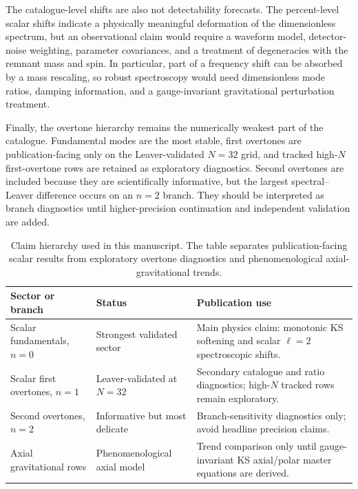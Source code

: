 \documentclass[10pt,letterpaper,twocolumn]{article}
\begin{document}
The catalogue-level shifts are also not detectability forecasts. The percent-level scalar shifts indicate a physically meaningful deformation of the dimensionless spectrum, but an observational claim would require a waveform model, detector-noise weighting, parameter covariances, and a treatment of degeneracies with the remnant mass and spin. In particular, part of a frequency shift can be absorbed by a mass rescaling, so robust spectroscopy would need dimensionless mode ratios, damping information, and a gauge-invariant gravitational perturbation treatment.

Finally, the overtone hierarchy remains the numerically weakest part of the catalogue. Fundamental modes are the most stable, first overtones are publication-facing only on the Leaver-validated \(N=32\) grid, and tracked high-\(N\) first-overtone rows are retained as exploratory diagnostics. Second overtones are included because they are scientifically informative, but the largest spectral--Leaver difference occurs on an \(n=2\) branch. They should be interpreted as branch diagnostics until higher-precision continuation and independent validation are added.

\begin{table}[t]
\centering
\footnotesize
\renewcommand{\arraystretch}{1.16}
\begin{tabularx}{\textwidth}{p{}p{}X}
\toprule
Sector or branch & Status & Publication use \\
\midrule
Scalar fundamentals, \(n=0\) & Strongest validated sector & Main physics claim: monotonic KS softening and scalar \(\ell=2\) spectroscopic shifts. \\
Scalar first overtones, \(n=1\) & Leaver-validated at \(N=32\) & Secondary catalogue and ratio diagnostics; high-\(N\) tracked rows remain exploratory. \\
Second overtones, \(n=2\) & Informative but most delicate & Branch-sensitivity diagnostics only; avoid headline precision claims. \\
Axial gravitational rows & Phenomenological axial model & Trend comparison only until gauge-invariant KS axial/polar master equations are derived. \\
\bottomrule
\end{tabularx}
\caption{Claim hierarchy used in this manuscript. The table separates publication-facing scalar results from exploratory overtone diagnostics and phenomenological axial-gravitational trends.}
\label{tab:claimhierarchy}
\end{table}
\end{document}
